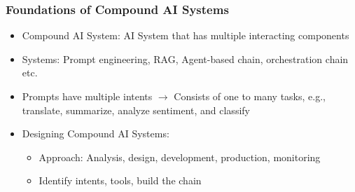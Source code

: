 \documentclass[11pt]{scrartcl}
\begin{document}
\subsubsection*{Foundations of Compound AI Systems}
\begin{itemize}
	\item Compound AI System: AI System that has multiple interacting components
	\item Systems: Prompt engineering, RAG, Agent-based chain, orchestration chain etc.
	\item Prompts have multiple intents $\to$ Consists of one to many tasks, e.g., translate, summarize, analyze sentiment, and classify
\end{itemize}
\begin{itemize}
	\item Designing Compound AI Systems:
	\begin{itemize}
		\item Approach: Analysis, design, development, production, monitoring
		\item Identify intents, tools, build the chain
	\end{itemize}
\end{itemize} 
\end{document}
